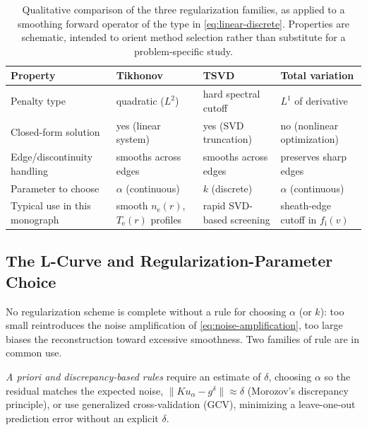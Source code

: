 \begin{table}[htbp]
\centering
\caption{Qualitative comparison of the three regularization families, as applied to a smoothing forward operator of the type in \cref{eq:linear-discrete}. Properties are schematic, intended to orient method selection rather than substitute for a problem-specific study.}
\label{tab:regularization-comparison}
\begin{tabularx}{\textwidth}{@{}l >{\raggedright\arraybackslash}X >{\raggedright\arraybackslash}X >{\raggedright\arraybackslash}X@{}}
\toprule
Property & Tikhonov & TSVD & Total variation \\
\midrule
Penalty type & quadratic ($L^2$) & hard spectral cutoff & $L^1$ of derivative \\
Closed-form solution & yes (linear system) & yes (SVD truncation) & no (nonlinear optimization) \\
Edge/discontinuity handling & smooths across edges & smooths across edges & preserves sharp edges \\
Parameter to choose & $\alpha$ (continuous) & $k$ (discrete) & $\alpha$ (continuous) \\
Typical use in this monograph & smooth $n_{\mathrm{e}}(r)$, $T_{\mathrm{e}}(r)$ profiles & rapid SVD-based screening & sheath-edge cutoff in $f_{\mathrm{i}}(v)$ \\
\bottomrule
\end{tabularx}
\end{table}

\subsection{The L-Curve and Regularization-Parameter Choice}
\label{sec:l-curve}

No regularization scheme is complete without a rule for choosing $\alpha$ (or $k$): too small reintroduces the noise amplification of \cref{eq:noise-amplification}, too large biases the reconstruction toward excessive smoothness. Two families of rule are in common use.

\emph{A priori and discrepancy-based rules} require an estimate of $\delta$, choosing $\alpha$ so the residual matches the expected noise, $\|Ku_{\alpha} - g^{\delta}\| \approx \delta$ (Morozov's discrepancy principle), or use generalized cross-validation (GCV), minimizing a leave-one-out prediction error without an explicit $\delta$.

